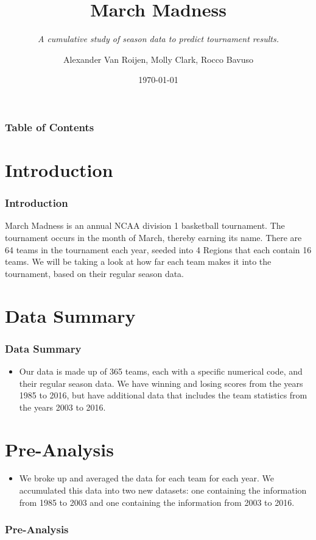 \documentclass[11pt]{beamer}
\begin{document}
	\author{\footnotesize Alexander Van Roijen, Molly Clark, Rocco Bavuso}
	\title{{\textbf{\huge March Madness}}}
	\subtitle{{\textit{\footnotesize A cumulative study of season data to predict tournament results.}}}
	\date{\today}
	\begin{frame}[plain]
	\maketitle
\end{frame}
\begin{frame}
\frametitle{\textbf{\huge Table of Contents}}
\tableofcontents
\end{frame}
\section{Introduction}
\begin{frame}
\frametitle{{\textbf{\huge Introduction}}}
\begin{center}
March Madness is an annual NCAA division 1 basketball tournament. The tournament occurs in the month of March, thereby earning its name. There are 64 teams in the tournament each year, seeded into 4 Regions that each contain 16 teams. We will be taking a look at how far each team makes it into the tournament, based on their regular season data.
\end{center}
\end{frame}
\section{Data Summary}
\begin{frame}
\frametitle{{\textbf{\huge Data Summary}}}
\begin{itemize}
	\item Our data is made up of 365 teams, each with a specific numerical code, and their regular season data. We have winning and losing scores from the years 1985 to 2016, but have additional data that includes the team statistics from the years 2003 to 2016.
\end{itemize}
\end{frame}
\section{Pre-Analysis}
\begin{frame}
\begin{itemize}
	\item We broke up and averaged the data for each team for each year. We accumulated this data into two new datasets: one containing the information from 1985 to 2003 and one containing the information from 2003 to 2016.
\end{itemize}
\frametitle{{\textbf{\huge Pre-Analysis}}}
\end{frame}
\end{document}
